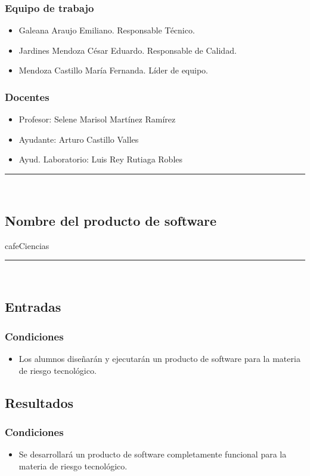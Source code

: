 \documentclass{article}
\begin{document}
\subsubsection*{Equipo de trabajo}
\begin{itemize}
\item Galeana Araujo Emiliano. Responsable Técnico.
\item Jardines Mendoza César Eduardo. Responsable de Calidad.
\item Mendoza Castillo María Fernanda. Líder de equipo.
\end{itemize}

\subsubsection*{Docentes}
\begin{itemize}
\item Profesor: Selene Marisol Martínez Ramírez
\item Ayudante: Arturo Castillo Valles
\item Ayud. Laboratorio: Luis Rey Rutiaga Robles
\end{itemize}
\rule{0.8\textwidth}{.8pt}\\

\subsection*{Nombre del producto de software}
cafeCiencias\\
\rule{0.8\textwidth}{.8pt}\\

\subsection*{Entradas}
\subsubsection*{Condiciones}
\begin{itemize}
\item Los alumnos diseñarán y ejecutarán un producto de software para la materia
  de riesgo tecnológico.
\end{itemize}

\subsection*{Resultados}
\subsubsection*{Condiciones}
\begin{itemize}
\item Se desarrollará un producto de software completamente funcional para la
  materia de riesgo tecnológico.
\end{itemize}
\end{document}
